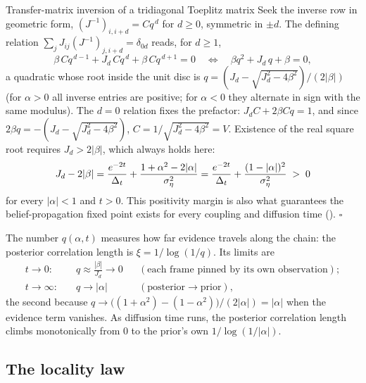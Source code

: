 \begin{toolbox}{Transfer-matrix inversion of a tridiagonal Toeplitz matrix}
Seek the inverse row in geometric form,
$(J^{-1})_{i, i+d} = C q^{\,d}$ for $d \geq 0$, symmetric in $\pm d$. The
defining relation $\sum_j J_{ij} (J^{-1})_{j, i+d} = \delta_{0d}$ reads,
for $d \geq 1$,
\begin{equation*}
  \beta\, C q^{\,d-1} + J_d\, C q^{\,d} + \beta\, C q^{\,d+1} = 0
  \quad\Longleftrightarrow\quad
  \beta q^2 + J_d\, q + \beta = 0,
\end{equation*}
a quadratic whose root inside the unit disc is
$q = (J_d - \sqrt{J_d^2 - 4\beta^2})/(2|\beta|)$ (for $\alpha > 0$ all
inverse entries are positive; for $\alpha < 0$ they alternate in sign with
the same modulus). The $d = 0$ relation fixes the prefactor:
$J_d C + 2\beta C q = 1$, and since
$2\beta q = -(J_d - \sqrt{J_d^2 - 4\beta^2})$,
$C = 1/\sqrt{J_d^2 - 4\beta^2} = V$. Existence of the real square root
requires $J_d > 2|\beta|$, which always holds here:
\begin{equation*}
  J_d - 2|\beta|
  = \frac{e^{-2t}}{\Delta_t} + \frac{1 + \alpha^2 - 2|\alpha|}{\sigma_\eta^2}
  = \frac{e^{-2t}}{\Delta_t} + \frac{(1 - |\alpha|)^2}{\sigma_\eta^2}
  \;>\; 0
\end{equation*}
for every $|\alpha| < 1$ and $t > 0$. This positivity margin is also what
guarantees the belief-propagation fixed point exists for every coupling
and diffusion time (\compendium{}). \hfill$\square$
\end{toolbox}

The number $q(\alpha, t)$ measures how far evidence travels along the
chain: the posterior correlation length is $\xi = 1/\log(1/q)$. Its limits
are
\begin{equation}
  \begin{aligned}
  t \to 0:&\quad q \approx \frac{|\beta|}{J_d} \to 0
  &&(\text{each frame pinned by its own observation});\\
  t \to \infty:&\quad q \to |\alpha|
  &&(\text{posterior} \to \text{prior}),
  \end{aligned}
  \label{eq:g-q-limits}
\end{equation}
the second because
$q \to \big((1+\alpha^2) - (1-\alpha^2)\big)/(2|\alpha|) = |\alpha|$ when
the evidence term vanishes. As diffusion time runs, the posterior
correlation length climbs monotonically from $0$ to the prior's own
$1/\log(1/|\alpha|)$.

\subsection{The locality law}

